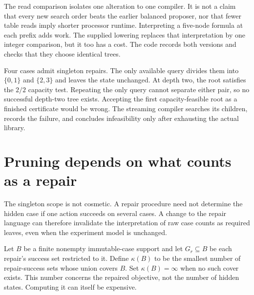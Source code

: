 The read comparison isolates one alteration to one compiler. It is not a claim that every new search order beats the earlier balanced proposer, nor that fewer table reads imply shorter processor runtime. Interpreting a five-node formula at each prefix adds work. The supplied lowering replaces that interpretation by one integer comparison, but it too has a cost. The code records both versions and checks that they choose identical trees.

\begin{SIIcounterexample}\label{SII:ex:local-capacity}
Four cases admit singleton repairs. The only available query divides them into $\{0,1\}$ and $\{2,3\}$ and leaves the state unchanged. At depth two, the root satisfies the $2/2$ capacity test. Repeating the only query cannot separate either pair, so no successful depth-two tree exists. Accepting the first capacity-feasible root as a finished certificate would be wrong. The streaming compiler searches its children, records the failure, and concludes infeasibility only after exhausting the actual library.
\end{SIIcounterexample}

\section{Pruning depends on what counts as a repair}\label{SII:sec:repair-cover}
The singleton scope is not cosmetic. A repair procedure need not determine the hidden case if one action succeeds on several cases. A change to the repair language can therefore invalidate the interpretation of raw case counts as required leaves, even when the experiment model is unchanged.

Let $B$ be a finite nonempty immutable-case support and let $G_r\subseteq B$ be each repair's success set restricted to it. Define $\kappa(B)$ to be the smallest number of repair-success sets whose union covers $B$. Set $\kappa(B)=\infty$ when no such cover exists. This number concerns the repaired objective, not the number of hidden states. Computing it can itself be expensive.

